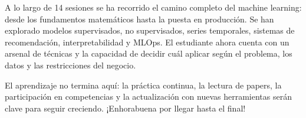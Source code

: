 \documentclass[12pt,a4paper,openany,oneside]{book}
\begin{document}
A lo largo de 14 sesiones se ha recorrido el camino completo del machine learning: desde los fundamentos matemáticos hasta la puesta en producción. Se han explorado modelos supervisados, no supervisados, series temporales, sistemas de recomendación, interpretabilidad y MLOps. El estudiante ahora cuenta con un arsenal de técnicas y la capacidad de decidir cuál aplicar según el problema, los datos y las restricciones del negocio.

El aprendizaje no termina aquí: la práctica continua, la lectura de papers, la participación en competencias y la actualización con nuevas herramientas serán clave para seguir creciendo. ¡Enhorabuena por llegar hasta el final!
\end{document}
